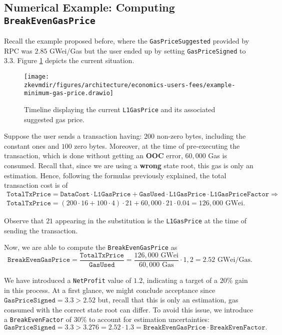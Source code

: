 \subsection{Numerical Example: Computing \texttt{BreakEvenGasPrice}}

Recall the example proposed before, where the \texttt{GasPriceSuggested} provided by RPC was $2.85$ GWei/Gas but the user ended up by setting \texttt{GasPriceSigned} to $3.3$. Figure \ref{fig:numerical-example-break-even-gas-price} depicts the current situation.

\begin{figure}[H]
\centering
\texttt{[image: \\zkevmdir/figures/architecture/economics-users-fees/example-minimum-gas-price.drawio]}
\caption{Timeline displaying the current \texttt{L1GasPrice} and its associated suggested gas price.}
\label{fig:numerical-example-break-even-gas-price}
\end{figure}

Suppose the user sends a transaction having: $200$ non-zero bytes, including the constant ones and $100$ zero bytes. Moreover, at the time of pre-executing the transaction, which is done without getting an \textbf{OOC} error, $60,000$ Gas is consumed. Recall that, since we are using a \textbf{wrong} state root, this gas is only an estimation. Hence, following the formulas previously explained, the total transaction cost is of
\begin{gather*}
\texttt{TotalTxPrice} = \texttt{DataCost} \cdot \texttt{L1GasPrice} + \texttt{GasUsed} \cdot \texttt{L1GasPrice} \cdot \texttt{L1GasPriceFactor} \Rightarrow \\
\texttt{TotalTxPrice} = \left( 200 \cdot 16 + 100 \cdot 4 \right) \cdot 21 + 60,000 \cdot 21 \cdot 0.04 = 126,000 \text{ GWei}.
\end{gather*}

Observe that $21$ appearing in the substitution is the \texttt{L1GasPrice} at the time of sending the transaction.

Now, we are able to compute the \texttt{BreakEvenGasPrice} as
\[
\texttt{BreakEvenGasPrice} = \frac{\texttt{TotalTxPrice}}{\texttt{GasUsed}} = \frac{126,000 \text{ GWei}}{60,000 \text{ Gas}} \cdot 1,2 = 2.52 \text{ GWei/Gas}.
\]

We have introduced a \texttt{NetProfit} value of $1.2$, indicating a target of a $20\%$ gain in this process. At a first glance, we might conclude acceptance since $\texttt{GasPriceSigned} = 3.3 > 2.52$ but, recall that this is only an estimation, gas consumed with the correct state root can differ. To avoid this issue, we introduce a \texttt{BreakEvenFactor} of $30\%$ to account for estimation uncertainties:
\[
\texttt{GasPriceSigned} = 3.3 > 3.276 = 2.52 \cdot 1.3 = \texttt{BreakEvenGasPrice} \cdot \texttt{BreakEvenFactor}.
\]

